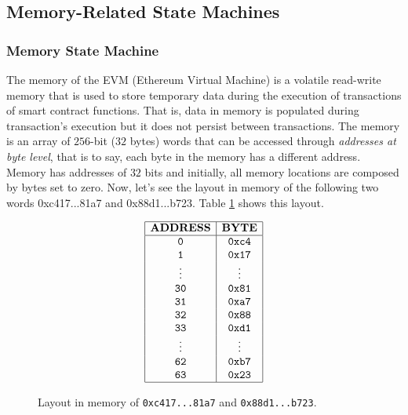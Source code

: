 \subsection{Memory-Related State Machines}



\subsubsection*{Memory State Machine}


The memory of the EVM (Ethereum Virtual Machine) is a volatile read-write memory that
is used to store temporary data during the execution of transactions of smart contract functions. That is, data in memory is populated during transaction's execution but it does not persist between transactions. The memory is an array of $256$-bit ($32$ bytes) words that can be accessed through \textit{addresses at byte level}, that is to say, each byte in the memory has a different address. Memory has addresses of $32$ bits and initially, all memory locations are composed by bytes set to zero. Now, let's see the layout in memory of the following two words 0xc417...81a7 and 0x88d1...b723. Table \ref{tab:first-example} shows this layout.

\begin{figure}[h!]
    \[
    \begin{array}{|c|c|}
        \hline
        \mathbf{ADDRESS} &\mathbf{BYTE} \\ \hline
        \mathtt{0} &\mathtt{0xc4} \\
        \mathtt{1} &\mathtt{0x17} \\
        \mathtt{\vdots} &\mathtt{\vdots} \\
        \mathtt{30} &\mathtt{0x81} \\
        \mathtt{31} &\mathtt{0xa7} \\
        \mathtt{32} &\mathtt{0x88} \\
        \mathtt{33} &\mathtt{0xd1} \\
        \mathtt{\vdots} &\mathtt{\vdots} \\
        \mathtt{62} &\mathtt{0xb7} \\
        \mathtt{63} &\mathtt{0x23} \\
        \hline
    \end{array}
    \]
    \caption{Layout in memory of \texttt{0xc417...81a7} and \texttt{0x88d1...b723}.}
    \label{tab:first-example}
\end{figure}

